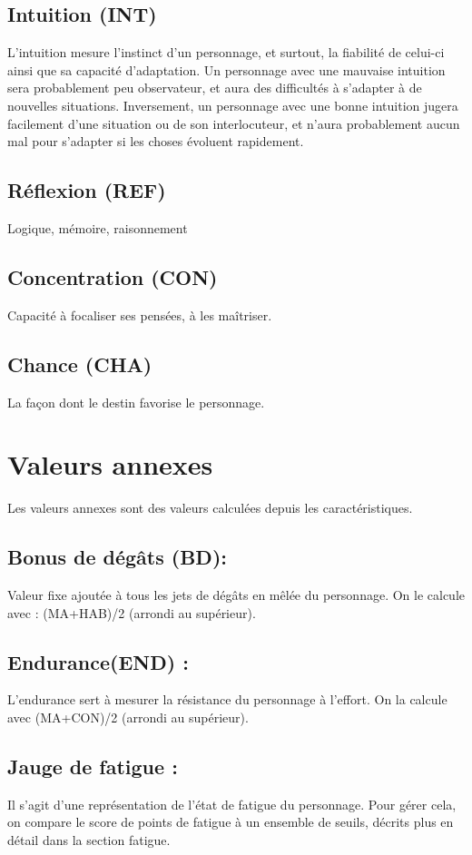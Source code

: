 \documentclass[10pt,a4paper,twocolumn]{book}
\begin{document}
\section{Intuition (INT)}
L’intuition mesure l’instinct d’un personnage, et surtout, la fiabilité de celui-ci ainsi que sa capacité d’adaptation.
Un personnage avec une mauvaise intuition sera probablement peu observateur, et aura des difficultés à s’adapter à de nouvelles situations. Inversement, un personnage avec une bonne intuition jugera facilement d’une situation ou de son interlocuteur, et n’aura probablement aucun mal pour s’adapter si les choses évoluent rapidement.
\section{Réflexion (REF)}
Logique, mémoire, raisonnement
\section{Concentration (CON)}
Capacité à focaliser ses pensées, à les maîtriser.
\section{Chance (CHA)}
La façon dont le destin favorise le personnage.
\chapter{Valeurs annexes}
Les valeurs annexes sont des valeurs calculées depuis les caractéristiques.
\section{Bonus de dégâts (BD):}
Valeur fixe ajoutée à tous les jets de dégâts en mêlée du personnage. On le calcule avec : (MA+HAB)/2 (arrondi au supérieur).
\section{Endurance(END) :}
L’endurance sert à mesurer la résistance du personnage à l’effort. On la calcule avec (MA+CON)/2 (arrondi au supérieur).
\section{Jauge de fatigue :}
Il s’agit d’une représentation de l’état de fatigue du personnage. Pour gérer cela, on compare le score de points de fatigue à un ensemble de seuils, décrits plus en détail dans la section fatigue.
\end{document}
